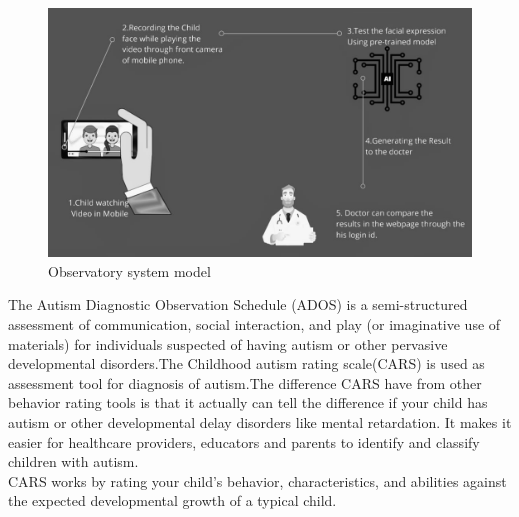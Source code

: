 \begin{figure}[h]
\label{ss}
\centering
\includegraphics[width= 14 cm]{Observatory system model.jpeg}
\caption{Observatory system model}
\end{figure}

The Autism Diagnostic Observation Schedule (ADOS) is a semi-structured assessment of communication, social interaction, and play (or imaginative use of materials) for individuals suspected of having autism or other pervasive developmental disorders.The Childhood autism rating scale(CARS) is used as assessment tool for diagnosis of autism.The difference CARS have from other behavior rating tools is that it actually can tell the difference if your child has autism or other developmental delay disorders like mental retardation. It makes it easier for healthcare providers, educators and parents to identify and classify children with autism.\\
CARS works by rating your child’s behavior, characteristics, and abilities against the expected developmental growth of a typical child.

